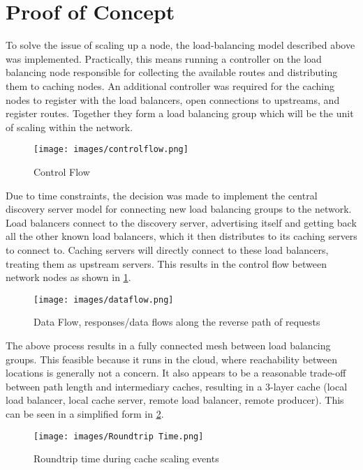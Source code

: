 \documentclass[conference]{IEEEtran}
\begin{document}
\section*{Proof of Concept}
To solve the issue of scaling up a node,
the load-balancing model described above was implemented.
Practically, this means running a controller on the load balancing node
responsible for collecting the available routes and distributing them
to caching nodes.
An additional controller was required for the caching nodes to register
with the load balancers, open connections to upstreams, and register routes.
Together they form a load balancing group
which will be the unit of scaling within the network.

\begin{figure}[ht]
    \centering
    \texttt{[image: images/controlflow.png]}
    \caption{Control Flow}
    \label{control}
\end{figure}

Due to time constraints,
the decision was made to implement the central discovery server model
for connecting new load balancing groups to the network.
Load balancers connect to the discovery server, advertising itself
and getting back all the other known load balancers,
which it then distributes to its caching servers to connect to.
Caching servers will directly connect to these load balancers,
treating them as upstream servers.
This results in the control flow between network nodes as shown in \ref{control}.

\begin{figure}[ht]
    \centering
    \texttt{[image: images/dataflow.png]}
    \caption{Data Flow, responses/data flows along the reverse path of requests}
    \label{data}
\end{figure}

The above process results in a fully connected mesh between load balancing groups.
This feasible because it runs in the cloud,
where reachability between locations is generally not a concern.
It also appears to be a reasonable trade-off between path length and intermediary caches,
resulting in a 3-layer cache (local load balancer, local cache server, remote load balancer, remote producer).
This can be seen in a simplified form in \ref{data}.


\begin{figure}[h]
    \centering
    \texttt{[image: images/Roundtrip Time.png]}
    \caption{Roundtrip time during cache scaling events}
    \label{rt}
\end{figure}
\end{document}
